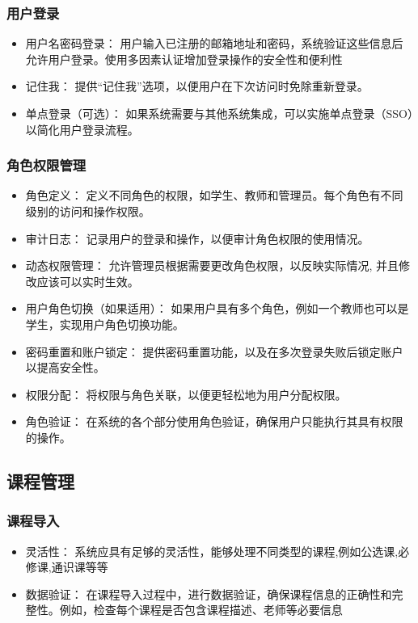\documentclass{article}
\begin{document}
\subsubsection{用户登录}
\begin{itemize}
  \item 用户名密码登录： 用户输入已注册的邮箱地址和密码，系统验证这些信息后允许用户登录。使用多因素认证增加登录操作的安全性和便利性
  \item 记住我： 提供“记住我”选项，以便用户在下次访问时免除重新登录。
  \item 单点登录（可选）： 如果系统需要与其他系统集成，可以实施单点登录（SSO）以简化用户登录流程。
\end{itemize}
\subsubsection{角色权限管理}
\begin{itemize}
  \item 角色定义： 定义不同角色的权限，如学生、教师和管理员。每个角色有不同级别的访问和操作权限。
  \item 审计日志： 记录用户的登录和操作，以便审计角色权限的使用情况。
  \item 动态权限管理： 允许管理员根据需要更改角色权限，以反映实际情况, 并且修改应该可以实时生效。
  \item 用户角色切换（如果适用）： 如果用户具有多个角色，例如一个教师也可以是学生，实现用户角色切换功能。
  \item 密码重置和账户锁定： 提供密码重置功能，以及在多次登录失败后锁定账户以提高安全性。
  \item 权限分配： 将权限与角色关联，以便更轻松地为用户分配权限。
  \item 角色验证： 在系统的各个部分使用角色验证，确保用户只能执行其具有权限的操作。
\end{itemize}
\subsection{课程管理}
\subsubsection{课程导入}
\begin{itemize}
  \item 灵活性： 系统应具有足够的灵活性，能够处理不同类型的课程,例如公选课,必修课,通识课等等
  \item 数据验证： 在课程导入过程中，进行数据验证，确保课程信息的正确性和完整性。例如，检查每个课程是否包含课程描述、老师等必要信息
\end{itemize}
\end{document}
